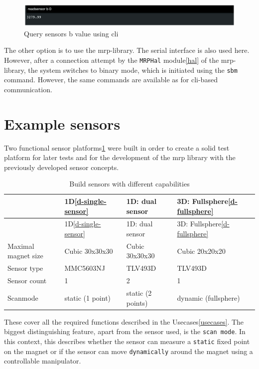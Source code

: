 \begin{figure}
\centering
\includegraphics{./generated_images/border_Query_sensors_b_value_using_(+cli).png}
\caption{Query sensors b value using \gls{cli}
\label{Query_sensors_b_value_using_(+cli).png}}
\end{figure}

The other option is to use the \gls{mrp}-library. The serial interface
is also used here. However, after a connection attempt by the
\passthrough{\lstinline!MRPHal!} module\ref{hal} of the
\gls{mrp}-library, the system switches to binary mode, which is
initiated using the \passthrough{\lstinline!sbm!} command. However, the
same commands are available as for \gls{cli}-based communication.

\hypertarget{example-sensors}{%
\section{Example sensors}\label{example-sensors}}

Two functional sensor
platforms\ref{Build_sensors_with_different_capabilities.csv} were built
in order to create a solid test platform for later tests and for the
development of the \gls{mrp} library with the previously developed
sensor concepts.

\begin{longtable}[]{@{}llll@{}}
\caption{Build sensors with different capabilities
\label{Build_sensors_with_different_capabilities.csv}}\tabularnewline
\toprule
& 1D\ref{d-single-sensor} & 1D: dual sensor & 3D:
Fullsphere\ref{d-fullsphere}\tabularnewline
\midrule
\endfirsthead
\toprule
& 1D\ref{d-single-sensor} & 1D: dual sensor & 3D:
Fullsphere\ref{d-fullsphere}\tabularnewline
\midrule
\endhead
Maximal magnet size & Cubic 30x30x30 & Cubic 30x30x30 & Cubic
20x20x20\tabularnewline
Sensor type & MMC5603NJ & TLV493D & TLV493D\tabularnewline
Sensor count & 1 & 2 & 1\tabularnewline
Scanmode & static (1 point) & static (2 points) & dynamic
(fullsphere)\tabularnewline
\bottomrule
\end{longtable}

These cover all the required functions described in the
Usecases\ref{usecases}. The biggest distinguishing feature, apart from
the sensor used, is the \passthrough{\lstinline!scan mode!}. In this
context, this describes whether the sensor can measure a
\passthrough{\lstinline!static!} fixed point on the magnet or if the
sensor can move \passthrough{\lstinline!dynamically!} around the magnet
using a controllable manipulator.

